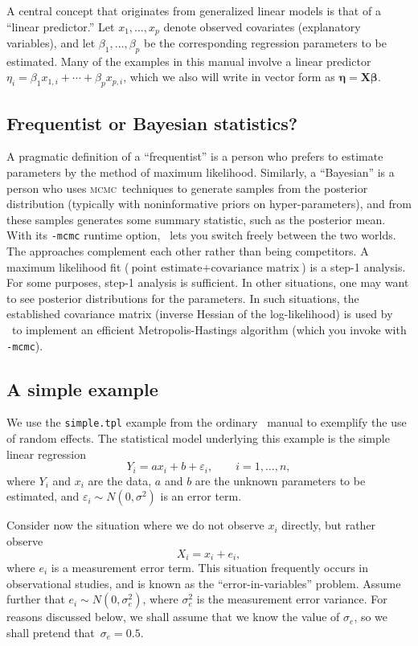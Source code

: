\documentclass{admbmanual}
\newcommand{\scMCMC}{\textsc{mcmc}}
\begin{document}
A central concept that originates from generalized linear models is that of a ``linear predictor.'' Let
$x_{1},\ldots ,x_{p}$ denote observed covariates (explanatory variables), and let $\beta _{1},\ldots ,\beta
_{p}$ be the corresponding regression parameters to be estimated. Many of the examples in this manual involve a
linear predictor $\eta_{i}=\beta_{1}x_{1,i}+\cdots +\beta_{p}x_{p,i}$, which we also will write in vector form as
$\mathbf{\eta}=\mathbf{X\beta }$.


\subsection{Frequentist or Bayesian statistics?} 

A pragmatic definition of a ``frequentist'' is a person who prefers to estimate parameters by the method of maximum likelihood.
Similarly, a ``Bayesian'' is a person who uses \scMCMC\ techniques to generate samples from the posterior distribution
(typically with noninformative priors on hyper-parameters), and from these samples generates some summary
statistic, such as the posterior mean. With its \texttt{-mcmc} runtime option, \scAB\ lets you switch freely between
the two worlds. The approaches complement each other rather than being competitors. A maximum
likelihood fit ($\textrm{point estimate} + \textrm{covariance matrix}$) is a step-1 analysis. For some purposes, step-1 analysis is
sufficient. In other situations, one may want to see posterior distributions for the parameters.
In such situations, the established covariance matrix (inverse Hessian of the log-likelihood) is used by \scAB\ 
to implement an efficient Metropolis-Hastings algorithm (which you invoke with \texttt{-mcmc}).


\subsection{A simple example}

We use the \texttt{simple.tpl} example from the ordinary \scAB\ manual to
exemplify the use of random effects. The statistical model underlying this
example is the simple linear regression
\[
Y_i=ax_i+b+\varepsilon_i,\qquad i=1,\ldots ,n,
\]
where $Y_i$ and $x_i$ are the data, $a$ and $b$ are the unknown parameters
to be estimated, and $\varepsilon_i\sim N(0,\sigma ^{2})$ is an error term.

Consider now the situation where we do not observe $x_i$ directly, but rather
observe
\[
X_i=x_i+e_i,
\]
where $e_i$ is a measurement error term. This situation frequently occurs in
observational studies, and is known as the ``error-in-variables'' problem.
Assume further that $e_i\sim N(0,\sigma_{e}^{2})$, where $\sigma_{e}^{2}$ is
the measurement error variance. For reasons discussed below, we shall assume that we know
the value of $\sigma_e$, so we shall pretend that~$\sigma_e=0.5$.
\end{document}

